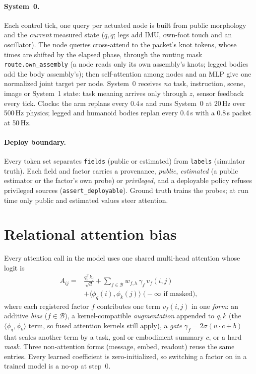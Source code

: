 \documentclass[10pt,twocolumn]{article}
\newcommand{\code}[1]{\texttt{\small #1}}
\begin{document}
\paragraph{System~0.} Each control tick, one query per actuated node is built from public morphology and the \emph{current} measured state ($q,\dot q$; legs add IMU, own-foot touch and an oscillator). The node queries cross-attend to the packet's knot tokens, whose times are shifted by the elapsed phase, through the routing mask \code{route.own\_assembly} (a node reads only its own assembly's knots; legged bodies add the body assembly's); then self-attention among nodes and an MLP give one normalized joint target per node. System~0 receives \emph{no} task, instruction, scene, image or System~1 state: task meaning arrives only through $z$, sensor feedback every tick. Clocks: the arm replans every 0.4\,s and runs System~0 at 20\,Hz over 500\,Hz physics; legged and humanoid bodies replan every 0.4\,s with a 0.8\,s packet at 50\,Hz.

\paragraph{Deploy boundary.} Every token set separates \code{fields} (public or estimated) from \code{labels} (simulator truth). Each field and factor carries a provenance, \emph{public}, \emph{estimated} (a public estimator or the factor's own probe) or \emph{privileged}, and a deployable policy refuses privileged sources (\code{assert\_deployable}). Ground truth trains the probes; at run time only public and estimated values steer attention.

\section{Relational attention bias}
Every attention call in the model uses one shared multi-head attention whose logit is
\begin{equation}
\begin{aligned}A_{ij}={}&\frac{q_i^{\top}k_j}{\sqrt d}+\sum_{f\in\mathcal{B}}w_{f,h}\,\gamma_f\,v_f(i,j)\\&+\big\langle\phi_q(i),\phi_k(j)\big\rangle\;\big(-\infty\text{ if masked}\big),\end{aligned}
\label{eq:logit}
\end{equation}
where each registered factor $f$ contributes one term $v_f(i,j)$ in one \emph{form}: an additive \emph{bias} ($f\in\mathcal B$), a kernel-compatible \emph{augmentation} appended to $q,k$ (the $\langle\phi_q,\phi_k\rangle$ term, so fused attention kernels still apply), a \emph{gate} $\gamma_f=2\sigma(u\cdot c+b)$ that scales another term by a task, goal or embodiment summary $c$, or a hard \emph{mask}. Three non-attention forms (message, embed, readout) reuse the same entries. Every learned coefficient is zero-initialized, so switching a factor on in a trained model is a no-op at step~0.
\end{document}
